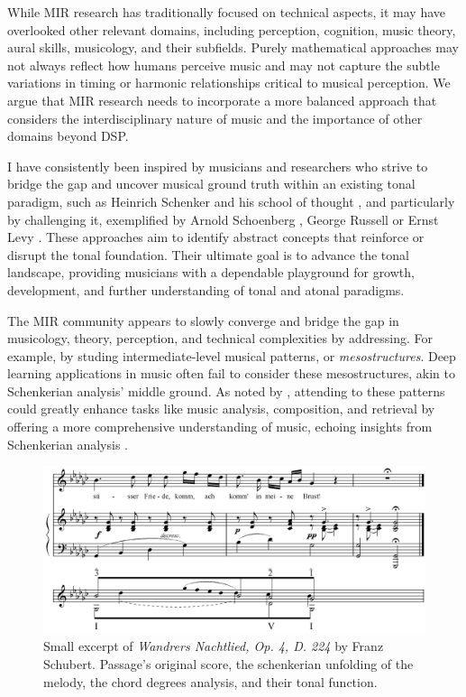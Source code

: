 While MIR research has traditionally focused on technical aspects, it may have overlooked other relevant domains, including perception, cognition, music theory, aural skills, musicology, and their subfields. Purely mathematical approaches may not always reflect how humans perceive music and may not capture the subtle variations in timing or harmonic relationships critical to musical perception. We argue that MIR research needs to incorporate a more balanced approach that considers the interdisciplinary nature of music and the importance of other domains beyond DSP.

I have consistently been inspired by musicians and researchers who strive to bridge the gap and uncover musical ground truth within an existing tonal paradigm, such as Heinrich Schenker and his school of thought \cite{Komar1959SchenkersStructure}, and particularly by challenging it, exemplified by Arnold Schoenberg \cite{Samson1974SchoenbergsMusic}, George Russell \cite{LydianRussell} or Ernst Levy \cite{LevyAHarmony}. These approaches aim to identify abstract concepts that reinforce or disrupt the tonal foundation. Their ultimate goal is to advance the tonal landscape, providing musicians with a dependable playground for growth, development, and further understanding of tonal and atonal paradigms.

The MIR community appears to slowly converge and bridge the gap in musicology, theory, perception, and technical complexities by addressing. For example, by studing intermediate-level musical patterns, or \textit{mesostructures}. Deep learning applications in music often fail to consider these mesostructures, akin to Schenkerian analysis' middle ground. As noted by \cite{Mesostructures2023}, attending to these patterns could greatly enhance tasks like music analysis, composition, and retrieval by offering a more comprehensive understanding of music, echoing insights from Schenkerian analysis \cite{Introduction_to_Schenkerian_Analysis}.


\begin{figure}[ht]
\includegraphics[clip,width=\columnwidth]{figures/schenkerian analysis/SchubertOp4no3.png}%
\caption[Excerpt of \textit{Wandrers Nachtlied, Op. 4, D. 224} by Franz Schubert.]{\small{Small excerpt of \textit{Wandrers Nachtlied, Op. 4, D. 224} by Franz Schubert. Passage's original score, the schenkerian unfolding of the melody, the chord degrees analysis, and their tonal function.}}
\label{fig:Wandrers Nachtlied, Op. 4, D. 224}
\end{figure}